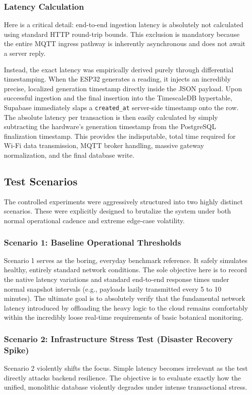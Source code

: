 \subsubsection{Latency Calculation}
Here is a critical detail: end-to-end ingestion latency is absolutely not calculated using standard HTTP round-trip bounds. This exclusion is mandatory because the entire MQTT ingress pathway is inherently asynchronous and does not await a server reply. 

Instead, the exact latency was empirically derived purely through differential timestamping. When the ESP32 generates a reading, it injects an incredibly precise, localized generation timestamp directly inside the JSON payload. Upon successful ingestion and the final insertion into the TimescaleDB hypertable, Supabase immediately slaps a \texttt{created\_at} server-side timestamp onto the row. The absolute latency per transaction is then easily calculated by simply subtracting the hardware's generation timestamp from the PostgreSQL finalization timestamp. This provides the indisputable, total time required for Wi-Fi data transmission, MQTT broker handling, massive gateway normalization, and the final database write.

\subsection{Test Scenarios}

The controlled experiments were aggressively structured into two highly distinct scenarios. These were explicitly designed to brutalize the system under both normal operational cadence and extreme edge-case volatility.

\subsubsection{Scenario 1: Baseline Operational Thresholds}
Scenario 1 serves as the boring, everyday benchmark reference. It safely simulates healthy, entirely standard network conditions. The sole objective here is to record the native latency variations and standard end-to-end response times under normal snapshot intervals (e.g., payloads lazily transmitted every 5 to 10 minutes). The ultimate goal is to absolutely verify that the fundamental network latency introduced by offloading the heavy logic to the cloud remains comfortably within the incredibly loose real-time requirements of basic botanical monitoring.

\subsubsection{Scenario 2: Infrastructure Stress Test (Disaster Recovery Spike)}
Scenario 2 violently shifts the focus. Simple latency becomes irrelevant as the test directly attacks backend resilience. The objective is to evaluate exactly how the unified, monolithic database violently degrades under intense transactional stress.

